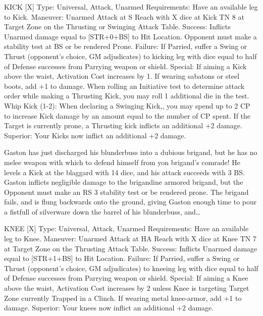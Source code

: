 \documentclass[oneside,11pt,english]{book}
\begin{document}
KICK [X] 
Type: Universal, Attack, Unarmed 
Requirements: Have an available leg to Kick. 
Maneuver: Unarmed Attack at S Reach with X dice at Kick TN 8 at Target Zone on the Thrusting or 
Swinging Attack Table. 
Success: Inflicts Unarmed damage equal to [STR+0+BS] to Hit Location. Opponent must make a stability 
test at BS or be rendered Prone. 
Failure: If Parried, suffer a Swing or Thrust (opponent’s choice, GM adjudicates) to kicking leg with 
dice equal to half of Defense successes from Parrying weapon or shield. 
Special: If aiming a Kick above the waist, Activation Cost increases by 1. If wearing sabatons or steel 
boots, add +1 to damage. 
When rolling an Initiative test to determine attack order while making a Thrusting Kick, you may roll 1 
additional die in the test. 
Whip Kick (1-2): When declaring a Swinging Kick,, you may spend up to 2 CP to increase Kick damage 
by an amount equal to the number of CP spent. 
If the Target is currently prone, a Thrusting kick inflicts an additional +2 damage. 
Superior: Your Kicks now inflict an additional +2 damage. 

 


Gaston has just discharged his blunderbuss into a dubious brigand, but he has no melee weapon with which to defend himself 
from yon brigand’s comrade! He levels a Kick at the blaggard with 14 dice, and his attack succeeds with 3 BS. Gaston inflicts 
negligible damage to the brigandine armored brigand, but the Opponent must make an RS 3 stability test or be rendered prone. 
The brigand fails, and is flung backwards onto the ground, giving Gaston enough time to pour a fistfull of silverware down the 
barrel of his blunderbuss, and… 

 

KNEE [X] 
Type: Universal, Attack, Unarmed 
Requirements: Have an available leg to Knee. 
Maneuver: Unarmed Attack at HA Reach with X dice at Knee TN 7 at Target Zone on the Thrusting 
Attack Table. 
Success: Inflicts Unarmed damage equal to [STR+1+BS] to Hit Location. 
Failure: If Parried, suffer a Swing or Thrust (opponent’s choice, GM adjudicates) to kneeing leg with 
dice equal to half of Defense successes from Parrying weapon or shield. 
Special: If aiming a Knee above the waist, Activation Cost increases by 2 unless Knee is targeting Target 
Zone currently Trapped in a Clinch. If wearing metal knee-armor, add +1 to damage. 
Superior: Your knees now inflict an additional +2 damage. 

 
\end{document}

